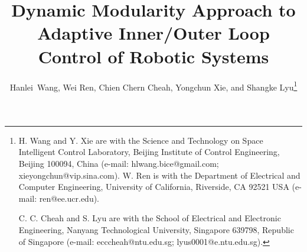 \documentclass[9pt,technote]{IEEEtran}
\begin{document}
\title{\LARGE \bf Dynamic Modularity Approach to Adaptive Inner/Outer Loop Control of Robotic Systems}

\author{Hanlei~Wang, Wei Ren, Chien Chern Cheah, Yongchun Xie, and  Shangke Lyu\thanks{H. Wang and Y. Xie are with the Science and Technology on Space Intelligent Control Laboratory,
Beijing Institute of Control Engineering,
Beijing 100094, China (e-mail: hlwang.bice@gmail.com; xieyongchun@vip.sina.com).
W. Ren is with the Department of Electrical and Computer Engineering, University of California, Riverside, CA 92521 USA (e-mail: ren@ee.ucr.edu).

C. C. Cheah and S. Lyu are with the School of Electrical and Electronic Engineering, Nanyang Technological University, Singapore 639798, Republic of Singapore (e-mail: ecccheah@ntu.edu.sg; lyus0001@e.ntu.edu.sg).
}
}











\maketitle
\end{document}
